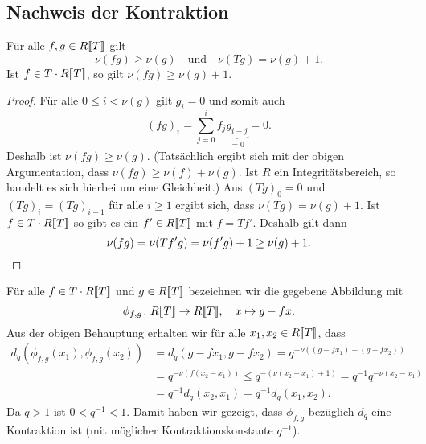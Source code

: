 \documentclass[a4paper, 10pt, numbers=noenddot]{scrartcl}
\begin{document}
\section{}
\label{section: calculation of units}



\subsection*{Nachweis der Kontraktion}

\begin{claim}
  Für alle $f, g \in R[\![T]\!]$ gilt
  \[
    \nu(f g) \geq \nu(g)
    \quad\text{und}\quad
    \nu(T g) = \nu(g) + 1.
  \]
  Ist $f \in T \cdot R[\![T]\!]$, so gilt $\nu(f g) \geq \nu(g) + 1$.
\end{claim}
\begin{proof}
  Für alle $0 \leq i < \nu(g)$ gilt $g_i = 0$ und somit auch
  \[
      (f g)_i
    = \sum_{j=0}^i f_j \underbrace{g_{i-j}}_{=0}
    = 0.
  \]
  Deshalb ist $\nu(f g) \geq \nu(g)$.  
  (Tatsächlich ergibt sich mit der obigen Argumentation, dass $\nu(fg) \geq \nu(f) + \nu(g)$.
  Ist $R$ ein Integritätsbereich, so handelt es sich hierbei um eine Gleichheit.)
  Aus $(T g)_0 = 0$ und $(T g)_i = (T g)_{i-1}$ für alle $i \geq 1$ ergibt sich, dass $\nu(T g) = \nu(g) + 1$.
  Ist $f \in T \cdot R[\![T]\!]$ so gibt es ein $f' \in R[\![T]\!]$ mit $f = T f'$.
  Deshalb gilt dann
  \[
          \nu(f g)
    =     \nu(T f' g)
    =     \nu(f' g) + 1
    \geq  \nu(g) + 1.
    \qedhere
  \]
\end{proof}

Für alle $f \in T \cdot R[\![T]\!]$ und $g \in R[\![T]\!]$ bezeichnen wir die gegebene Abbildung mit
\[
  \phi_{f,g} \colon R[\![T]\!] \to R[\![T]\!],
  \quad
  x \mapsto g - fx.
\]
Aus der obigen Behauptung erhalten wir für alle $x_1, x_2 \in R[\![T]\!]$, dass
\begin{align*}
        d_q( \phi_{f,g}(x_1), \phi_{f,g}(x_2) )
  &=    d_q(g - f x_1, g - f x_2)
   =    q^{-\nu((g - f x_1) - (g - f x_2))}
  \\
  &=    q^{-\nu(f (x_2 - x_1))}
  \leq  q^{-(\nu(x_2 - x_1) + 1)}
  =     q^{-1} q^{-\nu(x_2 - x_1)}
  \\
  &=    q^{-1} d_q(x_2, x_1)
  =     q^{-1} d_q(x_1, x_2).
\end{align*}
Da $q > 1$ ist $0 < q^{-1} < 1$.
Damit haben wir gezeigt, dass $\phi_{f,g}$ bezüglich $d_q$ eine Kontraktion ist (mit möglicher Kontraktionskonstante $q^{-1}$).
\end{document}
